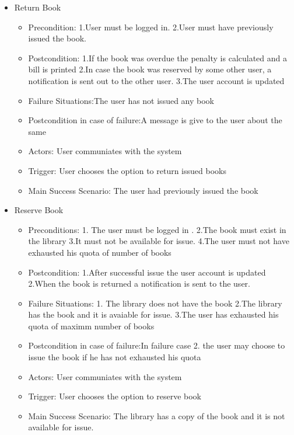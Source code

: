 \documentclass{article}
\begin{document}
\begin{enumerate}
\begin{itemize}
 \item Return Book
 \begin{itemize}
 \item Precondition:
 1.User must be logged in.
 2.User must have previously issued the book.
 \item Postcondition:
 1.If the book was overdue the penalty is calculated and a bill is printed 
 2.In case the book was reserved by some other user, a notification is sent out to the other user.
 3.The user account is updated
 \item Failure Situations:The user has not issued any book
 \item Postcondition in case of failure:A message is give to the user about the same
 \item Actors: User communiates with the system
 \item Trigger: User chooses the option to return issued books
\item  Main Success Scenario: The user had previously issued the book
 \end{itemize}
 
 \item Reserve Book
	\begin{itemize}
	\item  Preconditions:
	1. The user must be logged in .
	2.The book must exist in the library 
	3.It must not  be available for issue.
	4.The user must not have exhausted his quota of number of books
 \item Postcondition:
 1.After successful issue the user account is updated 
 2.When the book is returned a notification is sent to the user.
 \item Failure Situations:
 1. The library does not have  the book 
 2.The library has the book and it is  avaiable for issue.
 3.The user has exhausted his quota of maximm number of books
 \item Postcondition in case of failure:In failure case 2. the user may choose to issue the book if he has not exhausted his quota
 \item Actors: User communiates with the system
 \item Trigger: User chooses the option to reserve book
 \item Main Success Scenario: The library has a copy of the book and it is not available for issue.
 
	\end{itemize}
 

\end{itemize}
\end{enumerate}
\end{document}
